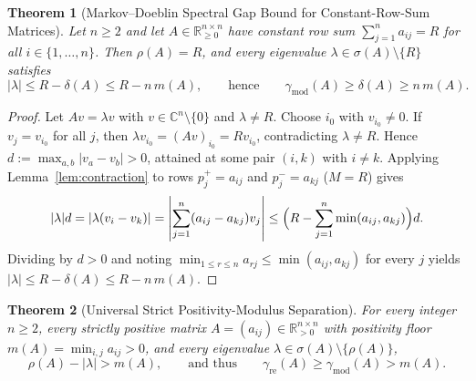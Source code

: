 \documentclass[11pt]{article}
\newtheorem{theorem}{Theorem}[section]
\theoremstyle{definition}
\newcommand{\R}{\mathbb{R}}
\newcommand{\C}{\mathbb{C}}
\begin{document}
\begin{theorem}[Markov--Doeblin Spectral Gap Bound for Constant-Row-Sum Matrices]\label{thm:doeblin}
Let $n \ge 2$ and let $A \in \R^{n \times n}_{\ge 0}$ have constant row sum $\sum_{j=1}^n a_{ij} = R$ for all $i \in \{1, \dots, n\}$. Then $\rho(A) = R$, and every eigenvalue $\lambda \in \sigma(A) \setminus \{R\}$ satisfies
\[
  |\lambda| \le R - \delta(A) \le R - n\,m(A),
  \qquad\text{hence}\qquad
  \gamma_{\mathrm{mod}}(A) \ge \delta(A) \ge n\,m(A).
\]
\end{theorem}

\begin{proof}
Let $A v = \lambda v$ with $v \in \C^n \setminus \{0\}$ and $\lambda \neq R$. Choose $i_0$ with $v_{i_0} \neq 0$. If $v_j = v_{i_0}$ for all $j$, then $\lambda v_{i_0} = (Av)_{i_0} = R v_{i_0}$, contradicting $\lambda \neq R$. Hence $d := \max_{a,b} |v_a - v_b| > 0$, attained at some pair $(i, k)$ with $i \neq k$. Applying Lemma~\ref{lem:contraction} to rows $p^+_j = a_{ij}$ and $p^-_j = a_{kj}$ ($M = R$) gives
\[
  |\lambda| d = |\lambda (v_i - v_k)| = \left|\sum_{j=1}^n (a_{ij} - a_{kj}) v_j\right|
  \le \Bigl(R - \sum_{j=1}^n \min(a_{ij}, a_{kj})\Bigr) d.
\]
Dividing by $d > 0$ and noting $\min_{1 \le r \le n} a_{rj} \le \min(a_{ij}, a_{kj})$ for every $j$ yields $|\lambda| \le R - \delta(A) \le R - n\,m(A)$.
\end{proof}

\begin{theorem}[Universal Strict Positivity-Modulus Separation]\label{thm:strict-floor}
For every integer $n \ge 2$, every strictly positive matrix $A = (a_{ij}) \in \R^{n \times n}_{>0}$ with positivity floor $m(A) = \min_{i,j} a_{ij} > 0$, and every eigenvalue $\lambda \in \sigma(A) \setminus \{\rho(A)\}$,
\[
  \rho(A) - |\lambda| > m(A),
  \qquad\text{and thus}\qquad
  \gamma_{\mathrm{re}}(A) \ge \gamma_{\mathrm{mod}}(A) > m(A).
\]
\end{theorem}
\end{document}
